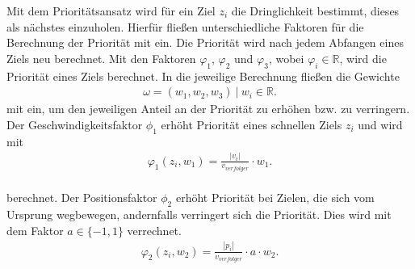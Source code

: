 \documentclass[german,version-2019-11]{uzl-thesis}
\begin{document}
Mit dem Prioritätsansatz wird für ein Ziel $z_i$ die Dringlichkeit bestimmt, dieses als nächstes einzuholen. Hierfür fließen unterschiedliche Faktoren für die Berechnung der Priorität mit ein. Die Priorität wird nach jedem Abfangen eines Ziels neu berechnet. Mit den Faktoren $\varphi_1$, $\varphi_2$ und $\varphi_3$, wobei $\varphi_i\in\mathbb{R}$, wird die Priorität eines Ziels berechnet. In die jeweilige Berechnung fließen die Gewichte
\begin{align*}
\omega = (w_1, w_2 ,w_3)~|~w_i \in\mathbb{R}.
\end{align*}
mit ein, um den jeweiligen Anteil an der Priorität zu erhöhen bzw. zu verringern.\\
Der Geschwindigkeitsfaktor $\phi_1$ erhöht Priorität eines schnellen Ziels $z_i$ und wird mit 
\begin{align}
\varphi_1(z_i, w_1) = \frac{|v_i|}{v_{verfolger}}\cdot w_1.
\end{align}\\
berechnet.
\label{def:FaktorPos}
Der Positionsfaktor $\phi_2$ erhöht Priorität bei Zielen, die sich vom Ursprung wegbewegen, andernfalls verringert sich die Priorität. Dies wird mit dem Faktor $a\in\{-1,1\}$ verrechnet.
\begin{align}
\varphi_2(z_i, w_2) = \frac{|p_i|}{v_{verfolger}}\cdot a \cdot w_2.
\end{align}\\
\end{document}
